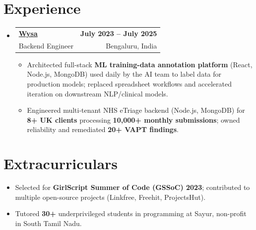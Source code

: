 \documentclass[letterpaper,10pt]{article}
\makeatletter
\newcommand{\resumeItem}[1]{
  \item\small{#1\vspace{-1pt}}
}
\newcommand{\resumeSubheading}[4]{
  \vspace{1pt}\item
    \begin{tabular*}{0.985\textwidth}[t]{l@{\extracolsep{\fill}}r}
      \textbf{#1} & \textbf{\small #2} \\
      {\small\color{ResumeSlate} #3} & {\small\color{ResumeSlate} #4} \\
    \end{tabular*}\vspace{-6pt}
}
\newcommand{\resumeSubHeadingListStart}{\begin{itemize}[leftmargin=0.0in, label={}, itemsep=2pt, topsep=2pt]}
\newcommand{\resumeSubHeadingListEnd}{\end{itemize}}
\newcommand{\resumeItemListStart}{\begin{itemize}[leftmargin=0.18in, itemsep=2pt, topsep=1pt]}
\newcommand{\resumeItemListEnd}{\end{itemize}\vspace{-4pt}}
\makeatother
\begin{document}
\section{Experience}
\resumeSubHeadingListStart
  \resumeSubheading
    {\href{https://www.wysa.io}{Wysa}}{July 2023 -- July 2025}
    {Backend Engineer}{Bengaluru, India}
    \resumeItemListStart
      \resumeItem{Architected full-stack \textbf{ML training-data annotation platform} (React, Node.js, MongoDB) used daily by the AI team to label data for production models; replaced spreadsheet workflows and accelerated iteration on downstream NLP/clinical models.}
      \resumeItem{Engineered multi-tenant NHS eTriage backend (Node.js, MongoDB) for \textbf{8+ UK clients} processing \textbf{10{,}000+ monthly submissions}; owned reliability and remediated \textbf{20+ VAPT findings}.}
    \resumeItemListEnd
\resumeSubHeadingListEnd
\vspace{-4pt}
\section{Extracurriculars}
\begin{itemize}[leftmargin=0.18in, itemsep=0pt, topsep=1pt]
  \item\small Selected for \textbf{GirlScript Summer of Code (GSSoC) 2023}; contributed to multiple open-source projects (Linkfree, Freehit, ProjectsHut).
  \item\small Tutored \textbf{30+} underprivileged students in programming at Sayur, non-profit in South Tamil Nadu.
\end{itemize}
\vspace{-6pt}
\end{document}
